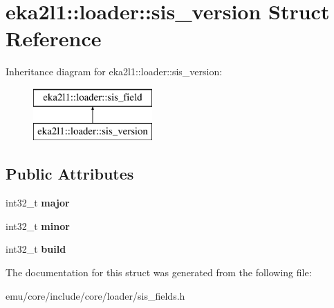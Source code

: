 \hypertarget{structeka2l1_1_1loader_1_1sis__version}{}\section{eka2l1\+:\+:loader\+:\+:sis\+\_\+version Struct Reference}
\label{structeka2l1_1_1loader_1_1sis__version}
Inheritance diagram for eka2l1\+:\+:loader\+:\+:sis\+\_\+version\+:\begin{figure}[H]
\begin{center}
\leavevmode
\includegraphics[height=2.000000cm]{structeka2l1_1_1loader_1_1sis__version}
\end{center}
\end{figure}
\subsection*{Public Attributes}
\begin{DoxyCompactItemize}
\item 
\mbox{\label{structeka2l1_1_1loader_1_1sis__version_a38121d695bd650f28f60379d9300a8b9}} 
int32\+\_\+t {\bfseries major}
\item 
\mbox{\label{structeka2l1_1_1loader_1_1sis__version_a5336f42ab0d5f6a2f1e2389a3db4a770}} 
int32\+\_\+t {\bfseries minor}
\item 
\mbox{\label{structeka2l1_1_1loader_1_1sis__version_a4743e55de0886923d6412b64a3f9a9d5}} 
int32\+\_\+t {\bfseries build}
\end{DoxyCompactItemize}


The documentation for this struct was generated from the following file\+:\begin{DoxyCompactItemize}
\item 
emu/core/include/core/loader/sis\+\_\+fields.\+h\end{DoxyCompactItemize}
